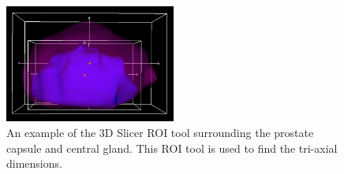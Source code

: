 \begin{figure}[htb!]
\centering
\includegraphics[width=0.5\textwidth]{zach/ROI/ROI.png}
\caption{An example of the 3D Slicer ROI tool surrounding the prostate capsule
    and central gland. This ROI tool is used to find the tri-axial dimensions.}
\label{fig:roi_tool} 
\end{figure}
